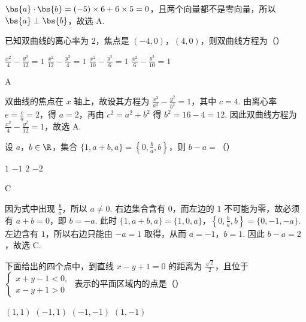 \begin{solution}
\(\bs{a}\cdot\bs{b}=(-5)\times6+6\times5=0\)，且两个向量都不是零向量，所以 \(\bs{a}\perp\bs{b}\)，故选 A.
\end{solution}

\begin{problem}
已知双曲线的离心率为 \(2\)，焦点是 \((-4,0)\)，\((4,0)\)，则双曲线方程为（\quad）

\choices
    {\( \frac{x^{2}}{4}-\frac{y^{2}}{12}=1 \)}
    {\( \frac{x^{2}}{12}-\frac{y^{2}}{4}=1 \)}
    {\( \frac{x^{2}}{10}-\frac{y^{2}}{6}=1 \)}
    {\( \frac{x^{2}}{6}-\frac{y^{2}}{10}=1 \)}
\end{problem}

\begin{answer}
A
\end{answer}

\begin{solution}
双曲线的焦点在 \(x\) 轴上，故设其方程为 \(\frac{x^2}{a^2}-\frac{y^2}{b^2}=1\)，其中 \(c=4\). 由离心率 \(e=\frac{c}{a}=2\)，得 \(a=2\)，再由 \(c^2=a^2+b^2\) 得 \(b^2=16-4=12\). 因此双曲线方程为 \(\frac{x^2}{4}-\frac{y^2}{12}=1\)，故选 A.
\end{solution}

\begin{problem}
设 \(a\)，\(b \in \R\)，集合 \(\{1, a + b, a\} = \left\{0, \frac{b}{a}, b\right\}\)，则 \(b - a =\)（\quad）

\choices
    {\(1\)}
    {\(-1\)}
    {\(2\)}
    {\(-2\)}
\end{problem}

\begin{answer}
C
\end{answer}

\begin{solution}
因为式中出现 \(\frac{b}{a}\)，所以 \(a\ne0\). 右边集合含有 \(0\)，而左边的 \(1\) 不可能为零，故必须有 \(a+b=0\)，即 \(b=-a\). 此时
\(\{1,a+b,a\}=\{1,0,a\}\)，\(\left\{0,\frac ba,b\right\}=\{0,-1,-a\}\).
左边含有 \(1\)，所以右边只能由 \(-a=1\) 取得，从而 \(a=-1\)，\(b=1\). 因此 \(b-a=2\)，故选 C.
\end{solution}

\begin{problem}
下面给出的四个点中，到直线 \(x - y + 1 = 0\) 的距离为 \(\frac{\sqrt{2}}{2}\)，且位于 \(\begin{cases}
x + y - 1 < 0,\\
x - y + 1 > 0
\end{cases}\) 表示的平面区域内的点是（\quad）

\choices
    {\((1,1)\)}
    {\((-1,1)\)}
    {\((-1,-1)\)}
    {\((1,-1)\)}
\end{problem}

